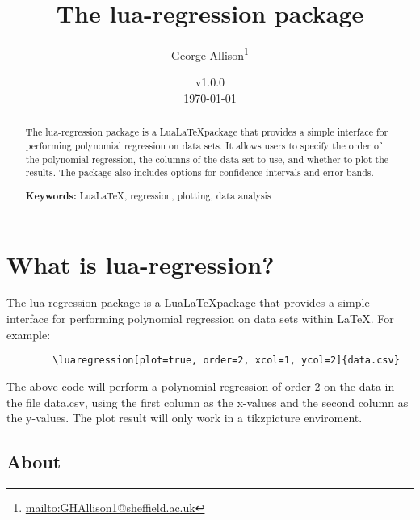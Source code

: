 \documentclass[11pt]{article}
\begin{document}
    \title{The {\ttfamily lua-regression} package}
    \author{George Allison\thanks{\href{mailto:GHAllison1@sheffield.ac.uk}{\ttfamily mailto:GHAllison1@sheffield.ac.uk}}}
    \date{v1.0.0\\ \today}

    \maketitle

    \begin{abstract}
        The {\ttfamily lua-regression} package is a Lua\LaTeX package that provides a simple interface for performing polynomial regression on data sets.
        It allows users to specify the order of the polynomial regression, the columns of the data set to use, and whether to plot the results.
        The package also includes options for confidence intervals and error bands.

        \vspace{1em}
        \noindent
        \textbf{Keywords:} LuaLaTeX, regression, plotting, data analysis
    \end{abstract}

    \tableofcontents

    \pagebreak

    \section{What is {\ttfamily lua-regression}?}

    The {\ttfamily lua-regression} package is a Lua\LaTeX package that provides a simple interface for performing polynomial regression on data sets within \LaTeX. For example:

    \begin{verbatim}
        \luaregression[plot=true, order=2, xcol=1, ycol=2]{data.csv}
    \end{verbatim}

    \noindent
    The above code will perform a polynomial regression of order 2 on the data in the file {\ttfamily data.csv}, using the first column as the x-values and the second column as the y-values.
    The plot result will only work in a tikzpicture enviroment.


    \subsection{About}
\end{document}
